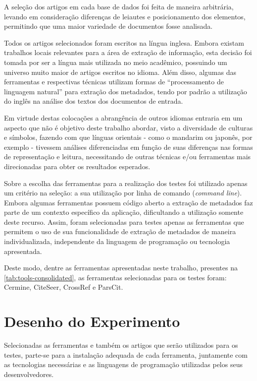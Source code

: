 A seleção dos artigos em cada base de dados foi feita de maneira arbitrária, levando em consideração diferenças de leiautes e posicionamento dos elementos, permitindo que uma maior variedade de documentos fosse analisada.


Todos os artigos selecionados foram escritos na língua inglesa. Embora existam trabalhos locais relevantes para a área de extração de informação, esta decisão foi tomada por ser a língua mais utilizada no meio acadêmico, possuindo um universo muito maior de artigos escritos no idioma. Além disso, algumas das ferramentas e respectivas técnicas utilizam formas de ``processamento de linguagem natural'' para extração dos metadados, tendo por padrão a utilização do inglês na análise dos textos dos documentos de entrada.

Em virtude destas colocações a abrangência de outros idiomas entraria em um aspecto que não é objetivo deste trabalho abordar, visto a diversidade de culturas e símbolos, fazendo com que línguas orientais - como o mandarim ou japonês, por exemplo - tivessem análises diferenciadas em função de suas diferenças nas formas de representação e leitura, necessitando de outras técnicas e/ou ferramentas mais direcionadas para obter os resultados esperados.

Sobre a escolha das ferramentas para a realização dos testes foi utilizado apenas um critério na seleção: a sua utilização por linha de comando (\emph{command line}). Embora algumas ferramentas possuem código aberto a extração de metadados faz parte de um contexto específico da aplicação, dificultando a utilização somente deste recurso. Assim, foram selecionadas para testes apenas as ferramentas que permitem o uso de sua funcionalidade de extração de metadados de maneira individualizada, independente da linguagem de programação ou tecnologia apresentada. 

Deste modo, dentre as ferramentas apresentadas neste trabalho, presentes na \autoref{tab:tools-consolidated}, as ferramentas selecionadas para os testes foram: Cermine, CiteSeer, CrossRef e ParsCit.
    
\section{Desenho do Experimento}
\label{sec:experiment-design}

Selecionadas as ferramentas e também os artigos que serão utilizados para os testes, parte-se para a instalação adequada de cada ferramenta, juntamente com as tecnologias necessárias e as linguagens de programação utilizadas pelos seus desenvolvedores. 

